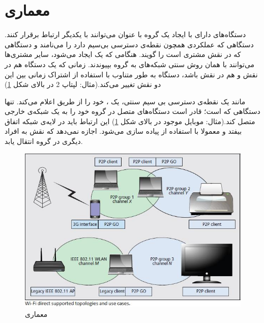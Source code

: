 \section{معماری}
دستگاه‌های دارای 
با ایجاد یک گروه با عنوان 
می‌توانند با یکدیگر ارتباط برقرار کنند. دستگاهی که عملکردی همچون نقطه‌ی دسترسی بی‌سیم دارد را 
می‌نامند و دستگاهی که در نقش مشتری است را 
گویند.
هنگامی که یک 
ایجاد می‌شود، سایر مشتری‌ها می‌توانند با همان روش سنتی شبکه‌های 
به گروه بپیوندند. زمانی که یک دستگاه هم در نقش 
 و هم در نقش 
باشد، دستگاه به طور متناوب با استفاده از اشتراک زمانی 
بین این دو نقش تغییر می‌کند.(مثال: لپتاپ 2 در بالای شکل \ref{fig:WifiDirectArchitecture})
\cite{WiFiAlliance}

 مانند یک نقطه‌ی دسترسی بی سیم سنتی، یک
، خود را از طریق 
  اعلام می‌کند. تنها دستگاهی که 
 است؛ قادر است دستگاه‌های متصل در گروه خود را به یک شبکه‌ی خارجی متصل کند.(مثال: موبایل موجود در بالا‌ی شکل \ref{fig:WifiDirectArchitecture}) این ارتباط باید در لایه‌ی شبکه 
اتفاق بیفتد و معمولا با استفاده از 
پیاده سازی می‌شود.
اجازه نمی‌دهد که نقش 
به افراد دیگری در گروه انتقال یابد.

\begin{figure}
	\centerline{
	\includegraphics{images/wifidirectarchitecture.jpg}}
	\caption{معماری \cite{Camps-Mur}}
	\label{fig:WifiDirectArchitecture}
\end{figure}

